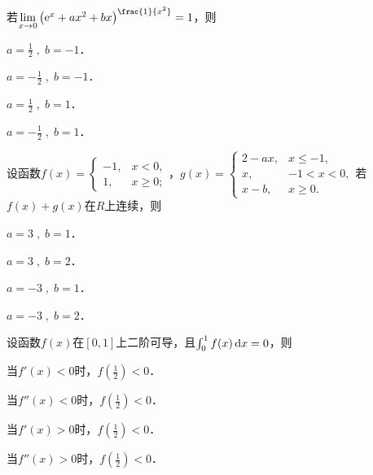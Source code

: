 \documentclass[plain,noanswer,medmath]{../../template/jnuexam}
\begin{document}






\begin{problem}
若$\lim_{x \to 0} \left(\e^x + ax^2 + bx \right)^{\frac{1}{x^2}} = 1$，则\pickout{}
\begin{abcd}
\item $a = \frac{1}{2}\;,\;b = - 1$．
\item $a = - \frac{1}{2}\;,\;b = - 1$．
\item $a = \frac{1}{2}\;,\;b = 1$．
\item $a = - \frac{1}{2}\;,\;b = 1$．
\end{abcd}
\end{problem}




\begin{problem}
设函数$f(x) = \begin{cases}
  -1, & x < 0, \\
   1, & x \ge 0;
\end{cases}$，$g(x) = \begin{cases}
  2 - ax, & x \le - 1, \\
       x, & -1 < x < 0, \\
   x - b, & x \ge 0.
\end{cases}$若$f(x) + g(x)$在$R$上连续，则\pickout{}
\begin{abcd}
\item $a = 3\;,\;b = 1$．
\item $a = 3\;,\;b = 2$．
\item $a = - 3\;,\;b = 1$．
\item $a = - 3\;,\;b = 2$．
\end{abcd}
\end{problem}


\begin{problem}
设函数$f(x)$在$[0,1]$上二阶可导，且$\int_0^1 f(x)\mathop{}\!\mathrm{d} x = 0$，则\pickout{}
\begin{abcd}
\item 当$f'(x) < 0$时，$f\left(\frac{1}{2} \right) < 0$．
\item 当$f''(x) < 0$时，$f\left(\frac{1}{2} \right) < 0$．
\item 当$f'(x) > 0$时，$f\left(\frac{1}{2} \right) < 0$．
\item 当$f''(x) > 0$时，$f\left(\frac{1}{2} \right) < 0$．
\end{abcd}
\end{problem}
\end{document}
